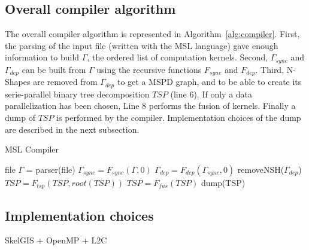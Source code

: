 \subsection{Overall compiler algorithm}

The overall compiler algorithm is represented in Algorithm~\ref{alg:compiler}. First, the parsing of the input file (written with the MSL language) gave enough information to build $\Gamma$, the ordered list of computation kernels. Second, $\Gamma_{sync}$ and $\Gamma_{dep}$ can be built from $\Gamma$ using the recursive functions $F_{sync}$ and $F_{dep}$. Third, N-Shapes are removed from $\Gamma_{dep}$ to get a MSPD graph, and to be able to create its serie-parallel binary tree decomposition $TSP$ (line 6). If only a data parallelization has been chosen, Line 8 performs the fusion of kernels. Finally a dump of $TSP$ is performed by the compiler. Implementation choices of the dump are described in the next subsection.

\begin{algorithm}
\caption{MSL Compiler}
\label{alg:compiler}
\begin{algorithmic}[1]
 {file}
\State $\Gamma$ = parser(file)
\State $\Gamma_{sync} = F_{sync}(\Gamma,0)$
\State $\Gamma_{dep} = F_{dep}(\Gamma_{sync},0)$
\State removeNSH($\Gamma_{dep}$)
\State $TSP = F_{tsp}(TSP,root(TSP))$
\State $TSP = F_{fus}(TSP)$
\EndIf
\State dump(TSP)
\EndProcedure
\end{algorithmic}
\end{algorithm}

\subsection{Implementation choices}

SkelGIS + OpenMP + L2C

